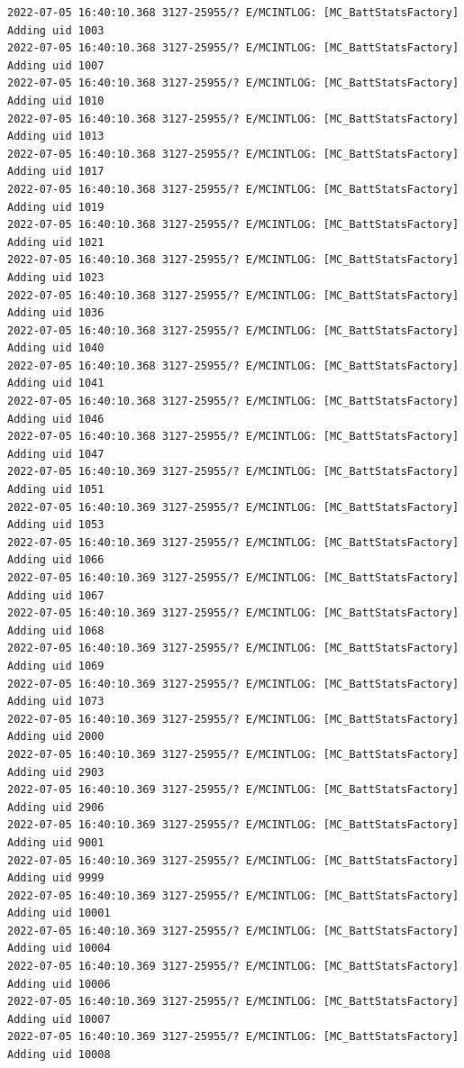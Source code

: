 \documentclass[a4paper,12pt]{book}
\begin{document}
\begin{lstlisting}
2022-07-05 16:40:10.368 3127-25955/? E/MCINTLOG: [MC_BattStatsFactory] Adding uid 1003
2022-07-05 16:40:10.368 3127-25955/? E/MCINTLOG: [MC_BattStatsFactory] Adding uid 1007
2022-07-05 16:40:10.368 3127-25955/? E/MCINTLOG: [MC_BattStatsFactory] Adding uid 1010
2022-07-05 16:40:10.368 3127-25955/? E/MCINTLOG: [MC_BattStatsFactory] Adding uid 1013
2022-07-05 16:40:10.368 3127-25955/? E/MCINTLOG: [MC_BattStatsFactory] Adding uid 1017
2022-07-05 16:40:10.368 3127-25955/? E/MCINTLOG: [MC_BattStatsFactory] Adding uid 1019
2022-07-05 16:40:10.368 3127-25955/? E/MCINTLOG: [MC_BattStatsFactory] Adding uid 1021
2022-07-05 16:40:10.368 3127-25955/? E/MCINTLOG: [MC_BattStatsFactory] Adding uid 1023
2022-07-05 16:40:10.368 3127-25955/? E/MCINTLOG: [MC_BattStatsFactory] Adding uid 1036
2022-07-05 16:40:10.368 3127-25955/? E/MCINTLOG: [MC_BattStatsFactory] Adding uid 1040
2022-07-05 16:40:10.368 3127-25955/? E/MCINTLOG: [MC_BattStatsFactory] Adding uid 1041
2022-07-05 16:40:10.368 3127-25955/? E/MCINTLOG: [MC_BattStatsFactory] Adding uid 1046
2022-07-05 16:40:10.368 3127-25955/? E/MCINTLOG: [MC_BattStatsFactory] Adding uid 1047
2022-07-05 16:40:10.369 3127-25955/? E/MCINTLOG: [MC_BattStatsFactory] Adding uid 1051
2022-07-05 16:40:10.369 3127-25955/? E/MCINTLOG: [MC_BattStatsFactory] Adding uid 1053
2022-07-05 16:40:10.369 3127-25955/? E/MCINTLOG: [MC_BattStatsFactory] Adding uid 1066
2022-07-05 16:40:10.369 3127-25955/? E/MCINTLOG: [MC_BattStatsFactory] Adding uid 1067
2022-07-05 16:40:10.369 3127-25955/? E/MCINTLOG: [MC_BattStatsFactory] Adding uid 1068
2022-07-05 16:40:10.369 3127-25955/? E/MCINTLOG: [MC_BattStatsFactory] Adding uid 1069
2022-07-05 16:40:10.369 3127-25955/? E/MCINTLOG: [MC_BattStatsFactory] Adding uid 1073
2022-07-05 16:40:10.369 3127-25955/? E/MCINTLOG: [MC_BattStatsFactory] Adding uid 2000
2022-07-05 16:40:10.369 3127-25955/? E/MCINTLOG: [MC_BattStatsFactory] Adding uid 2903
2022-07-05 16:40:10.369 3127-25955/? E/MCINTLOG: [MC_BattStatsFactory] Adding uid 2906
2022-07-05 16:40:10.369 3127-25955/? E/MCINTLOG: [MC_BattStatsFactory] Adding uid 9001
2022-07-05 16:40:10.369 3127-25955/? E/MCINTLOG: [MC_BattStatsFactory] Adding uid 9999
2022-07-05 16:40:10.369 3127-25955/? E/MCINTLOG: [MC_BattStatsFactory] Adding uid 10001
2022-07-05 16:40:10.369 3127-25955/? E/MCINTLOG: [MC_BattStatsFactory] Adding uid 10004
2022-07-05 16:40:10.369 3127-25955/? E/MCINTLOG: [MC_BattStatsFactory] Adding uid 10006
2022-07-05 16:40:10.369 3127-25955/? E/MCINTLOG: [MC_BattStatsFactory] Adding uid 10007
2022-07-05 16:40:10.369 3127-25955/? E/MCINTLOG: [MC_BattStatsFactory] Adding uid 10008

\end{lstlisting}
\end{document}
